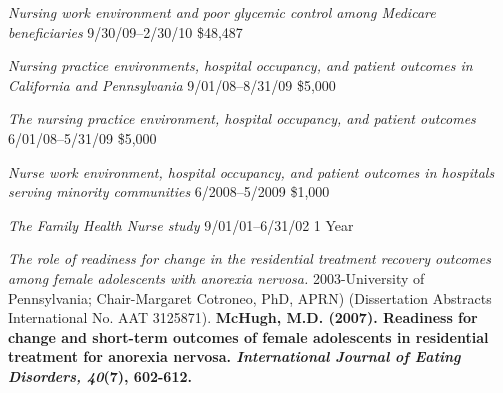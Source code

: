 \documentclass[10pt,]{article}
\begin{document}
{{{{{{{{{{{{{{\textit {Nursing work environment and poor glycemic control among Medicare beneficiaries} \hfill 9/30/09--2/30/10 \newline
{}	\hfill \$48,487

\textit {Nursing practice environments, hospital occupancy, and patient outcomes in California and Pennsylvania} \hfill 9/01/08--8/31/09 \newline
{} \hfill \$5,000

\textit {The nursing practice environment, hospital occupancy, and patient outcomes} \hfill 6/01/08--5/31/09 \newline
{}	\hfill \$5,000

\textit {Nurse work environment, hospital occupancy, and patient outcomes in hospitals serving minority communities} \hfill 6/2008--5/2009 \newline
{}	\hfill \$1,000

\textit {The Family Health Nurse study} \hfill 9/01/01--6/31/02 \newline
{} \hfill 1 Year

\vspace{4mm}


{\textit {The role of readiness for change in the residential treatment recovery outcomes among female adolescents with anorexia nervosa.}} 
2003-University of Pennsylvania; Chair-Margaret Cotroneo, PhD, APRN) (Dissertation Abstracts International No. AAT 3125871). {\textbf {\small {McHugh, M.D. (2007). Readiness for change and short-term outcomes of female adolescents in residential treatment for anorexia nervosa. {\textit {International Journal of Eating Disorders, 40}}(7), 602-612.}}}

\vspace{4mm}

}}}}}}}}}}}}}}
\end{document}
